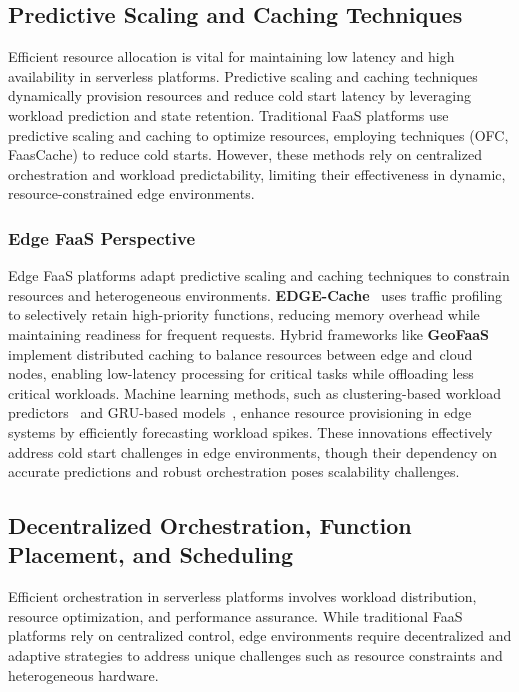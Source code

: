 \subsection{Predictive Scaling and Caching Techniques}

Efficient resource allocation is vital for maintaining low latency and high availability in serverless platforms. Predictive scaling and caching techniques dynamically provision resources and reduce cold start latency by leveraging workload prediction and state retention.
Traditional FaaS platforms use predictive scaling and caching to optimize resources, employing techniques (OFC, FaasCache) to reduce cold starts. However, these methods rely on centralized orchestration and workload predictability, limiting their effectiveness in dynamic, resource-constrained edge environments.



\subsubsection{Edge FaaS Perspective}

Edge FaaS platforms adapt predictive scaling and caching techniques to constrain resources and heterogeneous environments. \textbf{EDGE-Cache}~\cite{kim_delay-aware_2022} uses traffic profiling to selectively retain high-priority functions, reducing memory overhead while maintaining readiness for frequent requests. Hybrid frameworks like \textbf{GeoFaaS}~\cite{malekabbasi_geofaas_2024} implement distributed caching to balance resources between edge and cloud nodes, enabling low-latency processing for critical tasks while offloading less critical workloads. Machine learning methods, such as clustering-based workload predictors~\cite{gao_machine_2020} and GRU-based models~\cite{guo_applying_2018}, enhance resource provisioning in edge systems by efficiently forecasting workload spikes. These innovations effectively address cold start challenges in edge environments, though their dependency on accurate predictions and robust orchestration poses scalability challenges.

\subsection{Decentralized Orchestration, Function Placement, and Scheduling}

Efficient orchestration in serverless platforms involves workload distribution, resource optimization, and performance assurance. While traditional FaaS platforms rely on centralized control, edge environments require decentralized and adaptive strategies to address unique challenges such as resource constraints and heterogeneous hardware.



